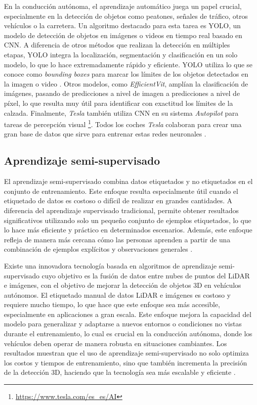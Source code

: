En la conducción autónoma, el aprendizaje automático juega un papel crucial, especialmente en la detección de objetos como peatones, señales de tráfico, otros vehículos o la carretera. Un algoritmo destacado para esta tarea es \ac{YOLO}, un modelo de detección de objetos en imágenes o videos en tiempo real basado en \ac{CNN}. A diferencia de otros métodos que realizan la detección en múltiples etapas, \ac{YOLO} integra la localización, segmentación y clasificación en un solo modelo, lo que lo hace extremadamente rápido y eficiente. \ac{YOLO} utiliza lo que se conoce como \textit{bounding boxes} para marcar los límites de los objetos detectados en la imagen o video \cite{yolo}. Otros modelos, como \textit{EfficientVit}, amplían la clasificación de imágenes, pasando de predicciones a nivel de imagen a predicciones a nivel de píxel, lo que resulta muy útil para identificar con exactitud los límites de la calzada. Finalmente, \textit{Tesla} también utiliza \ac{CNN} en su sistema \textit{Autopilot} para tareas de percepción visual \footnote{\url{https://www.tesla.com/es_es/AI}}. Todos los coches \textit{Tesla} colaboran para crear una gran base de datos que sirve para entrenar estas redes neuronales \cite{tesla-dataset}.

\subsection{Aprendizaje semi-supervisado}

El aprendizaje semi-supervisado combina datos etiquetados y no etiquetados en el conjunto de entrenamiento. Este enfoque resulta especialmente útil cuando el etiquetado de datos es costoso o difícil de realizar en grandes cantidades. A diferencia del aprendizaje supervisado tradicional, permite obtener resultados significativos utilizando solo un pequeño conjunto de ejemplos etiquetados, lo que lo hace más eficiente y práctico en determinados escenarios. Además, este enfoque refleja de manera más cercana cómo las personas aprenden a partir de una combinación de ejemplos explícitos y observaciones generales \cite{semi}.

Existe una innovadora tecnología basada en algoritmos de aprendizaje semi-supervisado cuyo objetivo es la fusión de datos entre nubes de puntos del \ac{LiDAR} e imágenes, con el objetivo de mejorar la detección de objetos 3D en vehículos autónomos. El etiquetado manual de datos \ac{LiDAR} e imágenes es costoso y requiere mucho tiempo, lo que hace que este enfoque sea más accesible, especialmente en aplicaciones a gran escala. Este enfoque mejora la capacidad del modelo para generalizar y adaptarse a nuevos entornos o condiciones no vistas durante el entrenamiento, lo cual es crucial en la conducción autónoma, donde los vehículos deben operar de manera robusta en situaciones cambiantes. Los resultados muestran que el uso de aprendizaje semi-supervisado no solo optimiza los costos y tiempos de entrenamiento, sino que también incrementa la precisión de la detección 3D, haciendo que la tecnología sea más escalable y eficiente \cite{semi-ex}.

